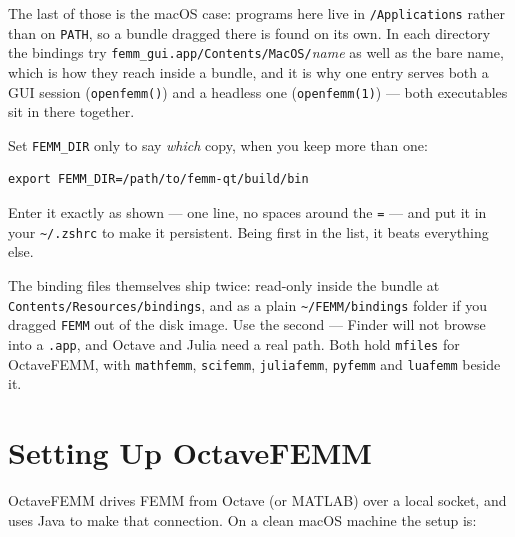 \documentclass[11pt]{article}
\begin{document}
The last of those is the macOS case: programs here live in
\texttt{/Applications} rather than on \texttt{PATH}, so a bundle dragged
there is found on its own.  In each directory the bindings try
\texttt{femm\_gui.app/Contents/MacOS/}\emph{name} as well as the bare
name, which is how they reach inside a bundle, and it is why one entry
serves both a GUI session (\texttt{openfemm()}) and a headless one
(\texttt{openfemm(1)}) --- both executables sit in there together.

Set \texttt{FEMM\_DIR} only to say \emph{which} copy, when you keep more
than one:
\begin{lstlisting}
export FEMM_DIR=/path/to/femm-qt/build/bin
\end{lstlisting}
Enter it exactly as shown --- one line, no spaces around the \texttt{=}
--- and put it in your \texttt{\textasciitilde/.zshrc} to make it
persistent.  Being first in the list, it beats everything else.

The binding files themselves ship twice: read-only inside the bundle at
\texttt{Contents/Resources/bindings}, and as a plain
\texttt{\textasciitilde/FEMM/bindings} folder if you dragged
\texttt{FEMM} out of the disk image.  Use the second --- Finder will not
browse into a \texttt{.app}, and Octave and Julia need a real path.  Both
hold \texttt{mfiles} for OctaveFEMM, with \texttt{mathfemm},
\texttt{scifemm}, \texttt{juliafemm}, \texttt{pyfemm} and
\texttt{luafemm} beside it.

\section{Setting Up OctaveFEMM}

OctaveFEMM drives FEMM from Octave (or MATLAB) over a local socket, and uses
Java to make that connection.  On a clean macOS machine the setup is:
\end{document}
